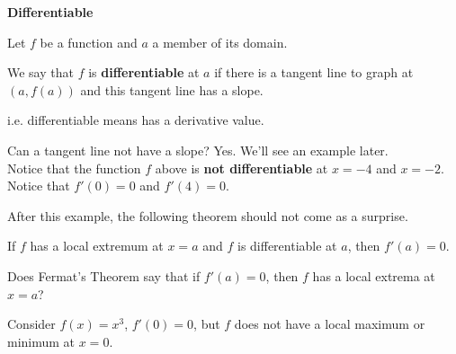 \documentclass{ximera}
\begin{document}
\begin{definition} \textbf{\textcolor{green!50!black}{Differentiable}}

Let $f$ be a function and $a$ a member of its domain.

We say that $f$ is \textbf{differentiable} at $a$ if there is a tangent line to graph at $(a, f(a))$ and this tangent line has a slope.


i.e. differentiable means has a derivative value.

\end{definition}
Can a tangent line not have a slope?  Yes. We'll see an example later. \\






Notice that the function $f$ above is \textbf{not differentiable} at  $x=-4$ and  $x=-2$. \\

Notice that $f'(0)=0$ and $f'(4)=0$.

After this example, the following theorem should not come as a surprise. 


\begin{theorem}\label{theorem:fermat}
If $f$ has a local extremum at $x=a$ and $f$ is differentiable at $a$, then $f'(a)=0$.
\end{theorem}





\begin{question}
  Does Fermat's Theorem say that if $f'(a) = 0$, then $f$ has a local
  extrema at $x=a$?
  \begin{multipleChoice}
  \end{multipleChoice}
  \begin{feedback}
    Consider $f(x) = x^3$, $f'(0) = 0$, but $f$ does not have a local
    maximum or minimum at $x=0$.
  \end{feedback}
\end{question}
\end{document}
